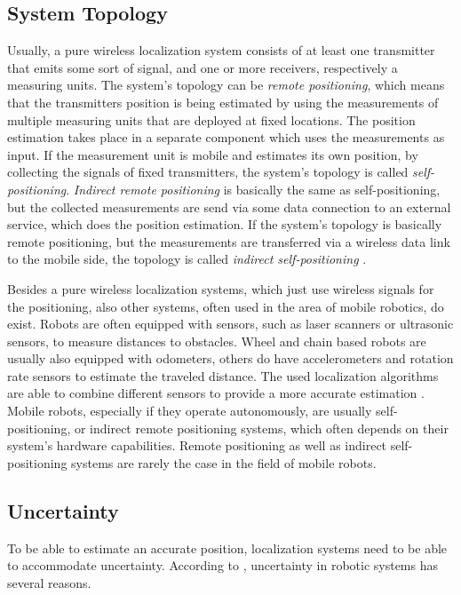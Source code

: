 \subsection{System Topology}
Usually, a pure wireless localization system consists of at least one transmitter that emits some sort of signal, and one or more receivers, respectively a measuring units. The system's topology can be \emph{remote positioning}, which means that the transmitters position is being estimated by using the measurements of multiple measuring units that are deployed at fixed locations. The position estimation takes place in a separate component which uses the measurements as input. If the measurement unit is mobile and estimates its own position, by collecting the signals of fixed transmitters, the system's topology is called \emph{self-positioning}. \emph{Indirect remote positioning} is basically the same as self-positioning, but the collected measurements are send via some data connection to an external service, which does the position estimation. If the system's topology is basically remote positioning, but the measurements are transferred via a wireless data link to the mobile side, the topology is called \emph{indirect self-positioning} \citep{IEEE:survey_wireless_indoor_pos}.

Besides a pure wireless localization systems, which just use wireless signals for the positioning, also other systems, often used in the area of mobile robotics, do exist. Robots are often equipped with sensors, such as laser scanners or ultrasonic sensors, to measure distances to obstacles. Wheel and chain based robots are usually also equipped with odometers, others do have accelerometers and rotation rate sensors to estimate the traveled distance. The used localization algorithms are able to combine different sensors to provide a more accurate estimation \citep{thrun:prob_robo}. Mobile robots, especially if they operate autonomously, are usually self-positioning, or indirect remote positioning systems, which often depends on their system's hardware capabilities. Remote positioning as well as indirect self-positioning systems are rarely the case in the field of mobile robots.

\subsection{Uncertainty}
To be able to estimate an accurate position, localization systems need to be able to accommodate uncertainty. According to \citet{thrun:prob_robo}, uncertainty in robotic systems has several reasons.

